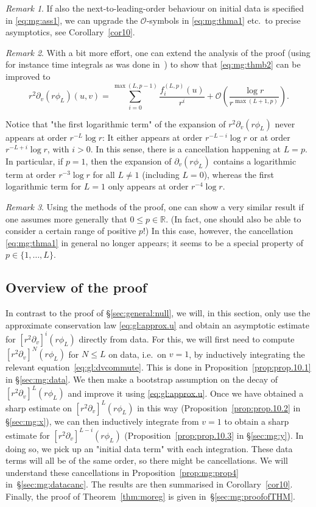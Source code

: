 \documentclass[11pt,english]{article}
\numberwithin{equation}{section}
\theoremstyle{remark}
\newtheorem{rem}{Remark}[section]
\theoremstyle{plain}
\theoremstyle{remark}
\newcommand{\pv}{\partial_v}
\renewcommand{\(}{\left(}
\renewcommand{\)}{\right)}
\begin{document}
\begin{rem}
If also the next-to-leading-order behaviour on initial data is specified in \eqref{eq:mg:ass1}, we can upgrade the $\mathcal O$-symbols in \eqref{eq:mg:thma1} etc.\ to precise asymptotics, see Corollary~\ref{cor10}.
\end{rem}
\begin{rem}\label{rem104}
With a bit more effort, one can extend the analysis of the proof (using for instance time integrals as was done in~\cite{I}) to show that \eqref{eq:mg:thmb2} can be improved to 
$$
r^2\pv(r\phi_L)(u,v)=\sum_{i=0}^{\max{(L,p-1)}}\frac{f^{(L,p)}_i(u)}{r^i}+\mathcal O\left(\frac{\log r}{r^{\max(L+1,p)}}\right).
$$

Notice that "the first logarithmic term" of the expansion of $r^2\pv(r\phi_L)$ never appears at order $r^{-L}\log r$: It either appears at order $r^{-L-i}\log r$ or at order $r^{-L+i}\log r$, with $i>0$. In this sense, there is a cancellation happening at $L=p$. In particular, if $p=1$, then the expansion of $\pv(r\phi_L)$ contains a logarithmic term at order $r^{-3}\log r$ for all $L\neq 1$ (including $L=0$), whereas the first logarithmic term for $L=1$ only appears at order $r^{-4}\log r$.
\end{rem}
\begin{rem}
Using the methods of the proof, one can show a very similar result if one assumes more generally that $0\leq p\in\mathbb R$. (In fact, one should also be able to consider a certain range of positive $p$!) In this case, however, the cancellation \eqref{eq:mg:thma1} in general no longer appears; it seems to be a special property of $p\in\{1,\dots, L\}$. 
\end{rem}

\subsection{Overview of the proof}\label{sec:mg:overview}
In contrast to the proof of \S \ref{sec:general:null}, we will, in this section, only use the approximate conservation law \eqref{eq:gl:approx.u} and obtain an asymptotic estimate for $[r^2\pv]^i(r\phi_L)$ directly from data. 
For this, we will first need to compute $[r^2\pv]^N(r\phi_L)$ for $N\leq L$ on data, i.e.\ on $v=1$, by inductively integrating the relevant equation~\eqref{eq:gl:dvcommute}. This is done in Proposition~\ref{prop:prop.10.1} in \S\ref{sec:mg:data}.  
We then make a bootstrap assumption on the decay of $[r^2\pv]^L(r\phi_L)$ and improve it using \eqref{eq:gl:approx.u}.
 Once we have obtained a sharp estimate on $[r^2\pv]^L(r\phi_L)$ in this way (Proposition~\ref{prop:prop.10.2} in \S\ref{sec:mg:x}), we can then inductively integrate from $v=1$ to obtain a sharp estimate for $[r^2\pv]^{L-i}(r\phi_L)$ (Proposition~\ref{prop:prop.10.3} in \S\ref{sec:mg:y}).
  In doing so, we pick up an "initial data term" with each integration. 
  These data terms will all be of the same order, so there might be cancellations. 
We will understand these cancellations  in Proposition~\ref{prop:mg:prop4} in~\S\ref{sec:mg:datacanc}. 
  The results are then summarised in Corollary~\ref{cor10}. 
  Finally, the proof of Theorem~\ref{thm:moreg} is given in~\S \ref{sec:mg:proofofTHM}.
\end{document}

